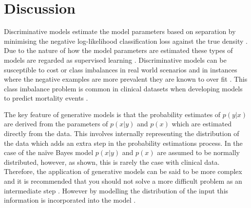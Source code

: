 \documentclass[a4paper,UKenglish]{oasics-v2016}
\begin{document}
\section{Discussion}

Discriminative models estimate the model parameters based on separation by minimising the negative log-likelihood classification loss against the true density \cite{Bouchard2004}. Due to the nature of how the model parameters are estimated these types of models are regarded as supervised learning \cite{Chapelle2006}. Discriminative models can be susceptible to cost or class imbalances in real world scenarios and in instances where the negative examples are more prevalent they are known to over fit \cite{Chawla2004}. This class imbalance problem is common in clinical datasets when developing models to predict mortality events \cite{Moore2015}. 

The key feature of generative models is that the probability estimates of $p(y|x)$ are derived from the parameters of $p(x|y)$ and $p(x)$ which are estimated directly from the data. This involves internally representing the distribution of the data which adds an extra step in the probability estimations process. In the case of the naïve Bayes model $p(x|y)$ and $p(x)$ are assumed to be normally distributed, however, as shown, this is rarely the case with clinical data. Therefore, the application of generative models can be said to be more complex and it is recommended that you should not solve a more difficult problem as an intermediate step \cite{9780471030034}. However by modelling the distribution of the input this information is incorporated into the model \cite{Chapelle2006}.
\end{document}

